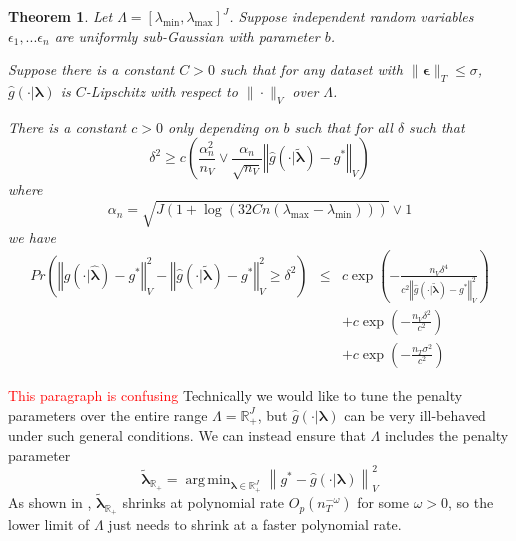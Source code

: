 \documentclass[12pt]{article}
\newtheorem{theorem}{Theorem}
\DeclareMathOperator*{\argmin}{arg\,min}
\begin{document}
\begin{theorem}
\label{train_val_thrm}
Let $\Lambda=[\lambda_{\min},\lambda_{\max}]^{J}$. Suppose independent random variables $\epsilon_1, ... \epsilon_n$ are uniformly sub-Gaussian with parameter $b$. 

Suppose there is a constant $C>0$ such that for any dataset with $\|\boldsymbol{\epsilon}\|_T \le \sigma$, $\hat g (\cdot |\boldsymbol{\lambda} )$ is $C$-Lipschitz with respect to $\| \cdot \|_V$ over $\Lambda$.

There is a constant $c>0$ only depending on $b$ such that for all $\delta$ such that
\begin{equation}
\delta^{2}
\ge
c \left ( 
\frac{\alpha_{n}^2}{n_{V}}
\vee 
\frac{\alpha_{n}}{\sqrt{n_{V}}}\left\Vert \hat{g}\left (\cdot | \tilde{\boldsymbol{\lambda}} \right )-g^{*}\right\Vert _{V}
\right )
\end{equation}
where
\begin{equation}
\alpha_n = \sqrt{J \left (1 + \log\left ( 32Cn(\lambda_{\max} - \lambda_{\min}) \right ) \right )} \vee 1
\end{equation}
we have
\begin{eqnarray*}
	Pr\left(
	\left\Vert \hat{g}(\cdot|\hat{\boldsymbol{\lambda}})-g^{*}\right\Vert _{V}^2 -
	\left\Vert \hat{g}(\cdot|\tilde{\boldsymbol{\lambda}})-g^{*}\right\Vert _{V}^2
	\ge\delta^2
	\right )
	&\le& c\exp\left(-\frac{n_{V}\delta^{4}}{c^{2}\left\Vert  \hat{g}(\cdot|\tilde{\boldsymbol{\lambda}})-g^{*}\right\Vert _{V}^{2}}\right) \\
	&& +c\exp\left(-\frac{n_{V}\delta^{2}}{c^{2}}\right) \\
	&& +c\exp\left (
	-\frac{n_T \sigma^2}{c^2}
	\right )
\end{eqnarray*}

\end{theorem}

\textcolor{red}{This paragraph is confusing}
Technically we would like to tune the penalty parameters over the entire range $\Lambda = \mathbb{R}^J_+$, but $\hat g(\cdot | \boldsymbol{\lambda})$ can be very ill-behaved under such general conditions. We can instead ensure that $\Lambda$ includes the penalty parameter
\begin{equation}
\label{eq:true_oracle}
\tilde{\boldsymbol{\lambda}}_{\mathbb{R}_+}
= \argmin_{\boldsymbol{\lambda} \in \mathbb{R}^J_+}\left \| g^* - \hat{g}(\cdot | \boldsymbol \lambda) \right \|^2_V
\end{equation}
As shown in \citet{van2000empirical}, $\tilde{\boldsymbol{\lambda}}_{\mathbb{R}_+}$ shrinks at polynomial rate $O_p(n_T^{-\omega})$ for some $\omega>0$, so the lower limit of $\Lambda$ just needs to shrink at a faster polynomial rate.
\end{document}
